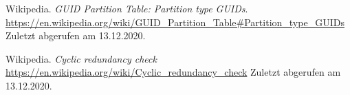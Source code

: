 \begin{thebibliography}{99}
        
        Wikipedia.
        \textit{GUID Partition Table: Partition type GUIDs}.
        \url{https://en.wikipedia.org/wiki/GUID_Partition_Table#Partition_type_GUIDs}
        Zuletzt abgerufen am 13.12.2020.

        Wikipedia.
        \textit{Cyclic redundancy check}
        \url{https://en.wikipedia.org/wiki/Cyclic_redundancy_check}
        Zuletzt abgerufen am 13.12.2020.
\end{thebibliography}
